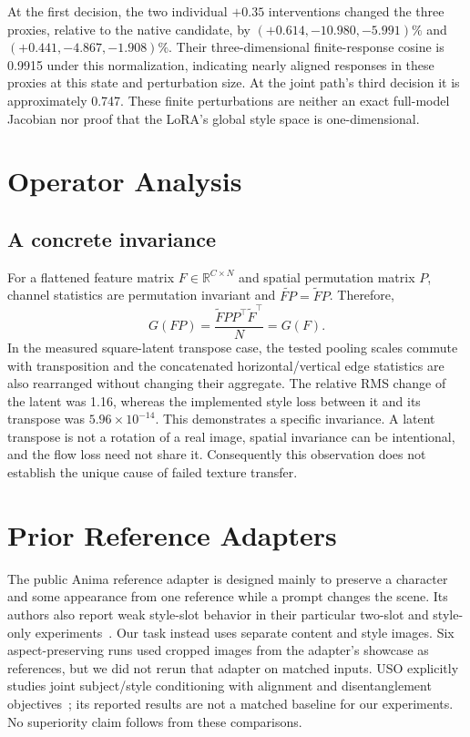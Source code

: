 \documentclass[10pt,letterpaper]{article}
\begin{document}
At the first decision, the two individual $+0.35$ interventions changed the three proxies, relative to the native candidate, by $(+0.614,-10.980,-5.991)\%$ and $(+0.441,-4.867,-1.908)\%$. Their three-dimensional finite-response cosine is 0.9915 under this normalization, indicating nearly aligned responses in these proxies at this state and perturbation size. At the joint path's third decision it is approximately 0.747. These finite perturbations are neither an exact full-model Jacobian nor proof that the LoRA's global style space is one-dimensional.

\section{Operator Analysis}
\subsection{A concrete invariance}
For a flattened feature matrix $F\in\mathbb R^{C\times N}$ and spatial permutation matrix $P$, channel statistics are permutation invariant and $\widetilde{FP}=\widetilde F P$. Therefore,
\begin{equation}
 G(FP)=\frac{\widetilde FPP^\top\widetilde F^\top}{N}=G(F).
 \label{eq:permutation}
\end{equation}
In the measured square-latent transpose case, the tested pooling scales commute with transposition and the concatenated horizontal/vertical edge statistics are also rearranged without changing their aggregate. The relative RMS change of the latent was 1.16, whereas the implemented style loss between it and its transpose was $5.96\times10^{-14}$. This demonstrates a specific invariance. A latent transpose is not a rotation of a real image, spatial invariance can be intentional, and the flow loss need not share it. Consequently this observation does not establish the unique cause of failed texture transfer.

\section{Prior Reference Adapters}
The public Anima reference adapter is designed mainly to preserve a character and some appearance from one reference while a prompt changes the scene. Its authors also report weak style-slot behavior in their particular two-slot and style-only experiments~\cite{animaadapter2026}. Our task instead uses separate content and style images. Six aspect-preserving runs used cropped images from the adapter's showcase as references, but we did not rerun that adapter on matched inputs. USO explicitly studies joint subject/style conditioning with alignment and disentanglement objectives~\cite{uso2025}; its reported results are not a matched baseline for our experiments. No superiority claim follows from these comparisons.
\end{document}
